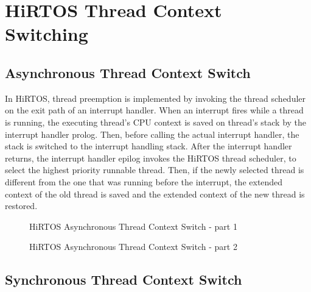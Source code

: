 \documentclass[11pt,letterpaper,twoside,openany]{book}
\begin{document}
\section{HiRTOS Thread Context Switching}

\subsection{Asynchronous Thread Context Switch}

In HiRTOS, thread preemption is implemented by invoking the thread scheduler
on the exit path of an interrupt handler. When an interrupt fires while
a thread is running, the executing thread's CPU context is saved
on thread's stack by the interrupt handler prolog. Then, before calling the
actual interrupt handler, the stack is switched to the interrupt handling stack.
After the interrupt handler returns, the interrupt handler epilog invokes
the HiRTOS thread scheduler, to select the highest priority runnable thread.
Then, if the newly selected thread is different from  the one that was running before
the interrupt, the extended context of the old thread is saved and the extended
context of the new thread is restored.

\begin{figure}[H]
   \centering
   \scalebox{0.40} {
      
   }
   \caption{HiRTOS Asynchronous Thread Context Switch - part 1}
   \label{HiRTOSumlSeqDiagram1}
\end{figure}

\begin{figure}[H]
   \centering
   \scalebox{0.35} {
      
   }
   \caption{HiRTOS Asynchronous Thread Context Switch - part 2}
   \label{HiRTOSumlSeqDiagram2}
\end{figure}

\subsection{Synchronous Thread Context Switch}
\end{document}
